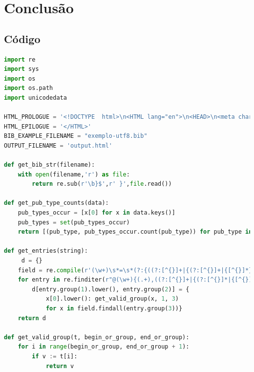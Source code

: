 \documentclass[11pt,a4paper]{report}
\begin{document}
\chapter{Conclusão}

\appendix
\begin{appendices}
\chapter{Código}


\begin{lstlisting}[language=python]
import re
import sys
import os
import os.path
import unicodedata

HTML_PROLOGUE = '<!DOCTYPE  html>\n<HTML lang="en">\n<HEAD>\n<meta charset="utf-8">\n      <TITLE>Categories in BibTeX</TITLE>\n <script type="text/x-mathjax-config"> MathJax.Hub.Config({"extensions":["tex2jax.js"],"jax":["input/TeX","output/HTML-CSS"],"messageStyle":"none","tex2jax":{"processEnvironments":false,"processEscapes":true,"inlineMath":[["$","$"]],"displayMath":[["$$","$$"],["\\[","\\]"]]},"TeX":{"extensions":["AMSmath.js","AMSsymbols.js","noErrors.js","noUndefined.js"]},"HTML-CSS":{"availableFonts":["TeX"]}}); </script> <script type="text/javascript" async src="file:////home/useralef/.vscode/extensions/shd101wyy.markdown-preview-enhanced-0.6.1/node_modules/@shd101wyy/mume/dependencies/mathjax/MathJax.js" charset="UTF-8"></script>  </HEAD>\n'
HTML_EPILOGUE = '</HTML>'
BIB_EXAMPLE_FILENAME = "exemplo-utf8.bib"
OUTPUT_FILENAME = 'output.html'

def get_bib_str(filename):
    with open(filename,'r') as file:
        return re.sub(r'\b}$',r' }',file.read())

def get_pub_type_counts(data):
    pub_types_occur = [x[0] for x in data.keys()]
    pub_types = set(pub_types_occur)
    return [(pub_type, pub_types_occur.count(pub_type)) for pub_type in pub_types]

def get_entries(string):
     d = {}
    field = re.compile(r'(\w+)\s*=\s*(?:{((?:[^{}]+|{(?:[^{}]+|{[^{}]*})+})+)}|"([^"]+)"|(\d+))')
    for entry in re.finditer(r"@(\w+){(.+),((?:[^{}]+|{(?:[^{}]*|{[^{}]*})+})+)", string):
        d[entry.group(1).lower(), entry.group(2)] = {
            x[0].lower(): get_valid_group(x, 1, 3)
            for x in field.findall(entry.group(3))}
    return d

def get_valid_group(t, begin_or_group, end_or_group):
    for i in range(begin_or_group, end_or_group + 1):
        if v := t[i]:
            return v


\end{lstlisting}
\end{appendices}
\end{document}
